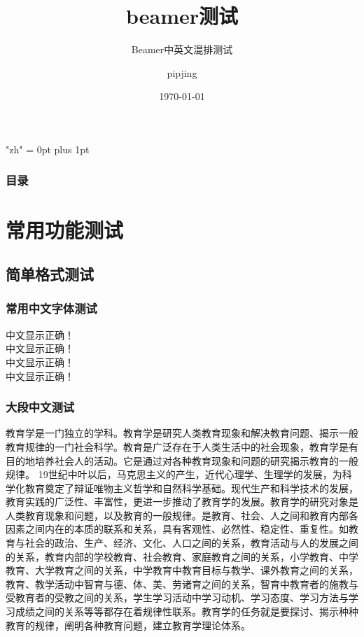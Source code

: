 \documentclass[presentation,11pt]{beamer}
\title{beamer测试}
\subtitle{Beamer中英文混排测试}
\author{pipjing}
\institute{\kaishu 西南大学\  数院}
\date{\today}
\begin{document}
 
 
 
\XeTeXlinebreaklocale "zh"  %
\XeTeXlinebreakskip = 0pt plus 1pt %
 
 
\begin{frame} 
\titlepage 
 
 
\end{frame} 
 
 
\begin{frame} 
\frametitle{目录} 
    \tableofcontents     %
 
 
\end{frame} 
 
 
 
 
\section{常用功能测试} 
\subsection{简单格式测试} 
 
 
\begin{frame} 
   \frametitle{常用中文字体测试} 
 
 
 
 
\kaishu 中文显示正确！\\  
\songti 中文显示正确！\\  
\heiti 中文显示正确！\\  
\fangsong 中文显示正确！\\ 


 
 
\end{frame} 
 
\begin{frame}[allowframebreaks] 
\frametitle{大段中文测试} 
教育学是一门独立的学科。教育学是研究人类教育现象和解决教育问题、揭示一般教育规律的一门社会科学。教育是广泛存在于人类生活中的社会现象，教育学是有目的地培养社会人的活动。它是通过对各种教育现象和问题的研究揭示教育的一般规律。
19世纪中叶以后，马克思主义的产生，近代心理学、生理学的发展，为科学化教育奠定了辩证唯物主义哲学和自然科学基础。现代生产和科学技术的发展，教育实践的广泛性、丰富性，更进一步推动了教育学的发展。教育学的研究对象是人类教育现象和问题，以及教育的一般规律。是教育、社会、人之间和教育内部各因素之间内在的本质的联系和关系，具有客观性、必然性、稳定性、重复性。如教育与社会的政治、生产、经济、文化、人口之间的关系，教育活动与人的发展之间的关系，教育内部的学校教育、社会教育、家庭教育之间的关系，小学教育、中学教育、大学教育之间的关系，中学教育中教育目标与教学、课外教育之间的关系，教育、教学活动中智育与德、体、美、劳诸育之间的关系，智育中教育者的施教与受教育者的受教之间的关系，学生学习活动中学习动机、学习态度、学习方法与学习成绩之间的关系等等都存在着规律性联系。教育学的任务就是要探讨、揭示种种教育的规律，阐明各种教育问题，建立教育学理论体系。
\end{frame} 
\end{document}
